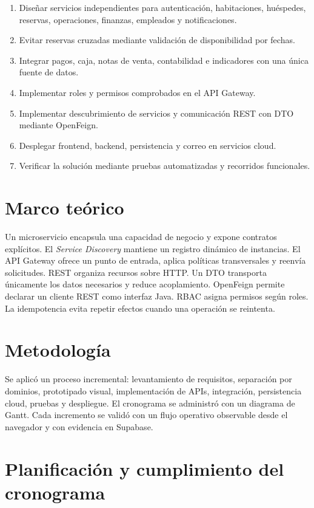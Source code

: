 \documentclass[12pt,a4paper]{article}
\begin{document}
\begin{enumerate}[label=\arabic*.]
\item Diseñar servicios independientes para autenticación, habitaciones, huéspedes, reservas, operaciones, finanzas, empleados y notificaciones.
\item Evitar reservas cruzadas mediante validación de disponibilidad por fechas.
\item Integrar pagos, caja, notas de venta, contabilidad e indicadores con una única fuente de datos.
\item Implementar roles y permisos comprobados en el API Gateway.
\item Implementar descubrimiento de servicios y comunicación REST con DTO mediante OpenFeign.
\item Desplegar frontend, backend, persistencia y correo en servicios cloud.
\item Verificar la solución mediante pruebas automatizadas y recorridos funcionales.
\end{enumerate}

\section{Marco teórico}

Un microservicio encapsula una capacidad de negocio y expone contratos explícitos. El \textit{Service Discovery} mantiene un registro dinámico de instancias. El API Gateway ofrece un punto de entrada, aplica políticas transversales y reenvía solicitudes. REST organiza recursos sobre HTTP. Un DTO transporta únicamente los datos necesarios y reduce acoplamiento. OpenFeign permite declarar un cliente REST como interfaz Java. RBAC asigna permisos según roles. La idempotencia evita repetir efectos cuando una operación se reintenta.

\section{Metodología}

Se aplicó un proceso incremental: levantamiento de requisitos, separación por dominios, prototipado visual, implementación de APIs, integración, persistencia cloud, pruebas y despliegue. El cronograma se administró con un diagrama de Gantt. Cada incremento se validó con un flujo operativo observable desde el navegador y con evidencia en Supabase.

\section{Planificación y cumplimiento del cronograma}
\end{document}
